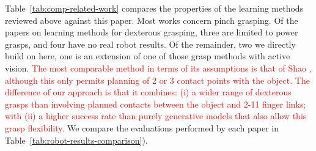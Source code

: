 Table~\ref{tab:comp-related-work} compares the properties of the learning methods reviewed above against this paper. Most works concern pinch grasping. Of the papers on learning methods for dexterous grasping, three \cite{varley2015generating,lu2017planning,detry2013a} are limited to power grasps, and four have no real robot results\cite{veres2017modeling,zhou20176dof,kappler2015leveraging,mandikal2021dexterous}. Of the remainder, two we directly build on here, one is an extension of one of those grasp methods with active vision. \textcolor{red}{The most comparable method in terms of its assumptions is that of Shao \cite{Shao2020}, although this only permits planning of 2 or 3 contact points with the object. The difference of our approach is that it combines: (i) a wider range of dexterous grasps than\cite{varley2015generating,lu2017planning,detry2013a,Shao2020} involving planned contacts between the object and 2-11 finger links; with (ii) a higher success rate than purely generative models \cite{kopicki2015ijrr,kopicki2019ijrr} that also allow this grasp flexibility.} We compare the evaluations performed by each paper in Table~\ref{tab:robot-results-comparison}). 


%
%
%
